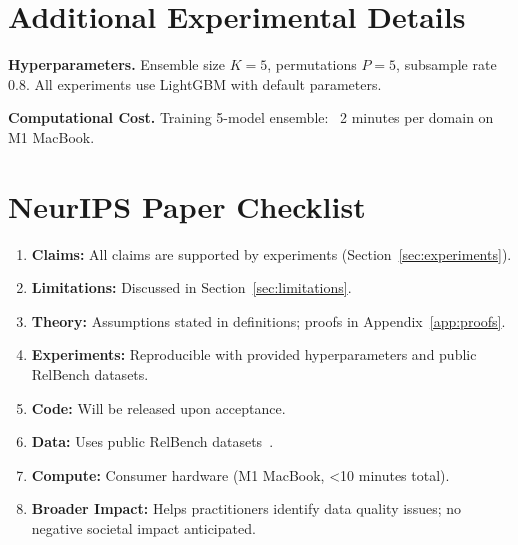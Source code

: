 \documentclass{article}
\begin{document}
\section{Additional Experimental Details}
\label{app:experiments}

\textbf{Hyperparameters.} Ensemble size $K=5$, permutations $P=5$, subsample rate 0.8.
All experiments use LightGBM with default parameters.

\textbf{Computational Cost.} Training 5-model ensemble: ~2 minutes per domain on M1 MacBook.

\section{NeurIPS Paper Checklist}

\begin{enumerate}
\item \textbf{Claims:} All claims are supported by experiments (Section~\ref{sec:experiments}).
\item \textbf{Limitations:} Discussed in Section~\ref{sec:limitations}.
\item \textbf{Theory:} Assumptions stated in definitions; proofs in Appendix~\ref{app:proofs}.
\item \textbf{Experiments:} Reproducible with provided hyperparameters and public RelBench datasets.
\item \textbf{Code:} Will be released upon acceptance.
\item \textbf{Data:} Uses public RelBench datasets~\citep{fey2024relbench}.
\item \textbf{Compute:} Consumer hardware (M1 MacBook, <10 minutes total).
\item \textbf{Broader Impact:} Helps practitioners identify data quality issues; no negative societal impact anticipated.
\end{enumerate}
\end{document}
